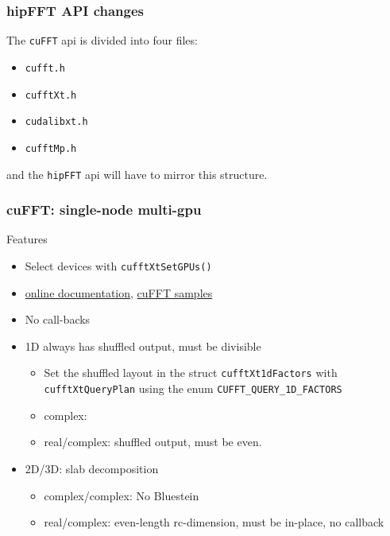 \documentclass[10pt,aspectratio=169]{beamer}
\begin{document}
\begin{frame}
  \frametitle{hipFFT API changes}

  The \texttt{cuFFT} api is divided into four files:
  \begin{itemize}
  \item \texttt{cufft.h}
  \item \texttt{cufftXt.h}
  \item \texttt{cudalibxt.h}
  \item \texttt{cufftMp.h}
  \end{itemize}
  and the \texttt{hipFFT} api will have to mirror this structure.
  
\end{frame}

\begin{frame}[fragile]
  \frametitle{cuFFT: single-node multi-gpu}

  \begin{center}Features\end{center}
  
  \begin{itemize}
  \item Select devices with \lstinline{cufftXtSetGPUs()}
  \item \href{https://docs.nvidia.com/cuda/cufft/index.html#multiple-gpu-data-organization}{online documentation}, \href{https://github.com/NVIDIA/CUDALibrarySamples/tree/master/cuFFT}{cuFFT samples}
  \end{itemize}

  \medskip
  
  \begin{itemize}
  \item No call-backs
  \item 1D always has shuffled output, must be divisible
    \begin{itemize}
    \item Set the shuffled layout in the struct \lstinline{cufftXt1dFactors} with \lstinline{cufftXtQueryPlan} using the enum \lstinline{CUFFT_QUERY_1D_FACTORS}
    \item complex: 
    \item real/complex: shuffled output, must be even.
    \end{itemize}
  \item 2D/3D: slab decomposition
    \begin{itemize}
    \item complex/complex: No Bluestein
    \item real/complex: even-length rc-dimension, must be in-place, no callback
    \end{itemize}
  \end{itemize}
    
\end{frame}
    
\end{document}
